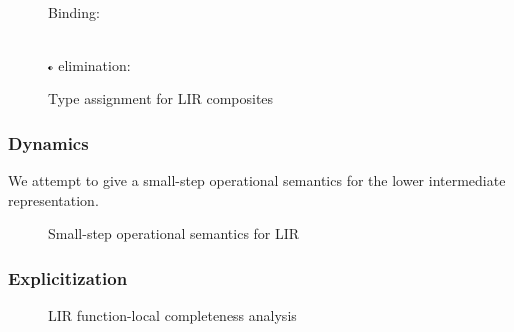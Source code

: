\documentclass[index.tex]{subfiles}
\begin{document}
\begin{figure}
\begin{mathpar}
  \end{mathpar} \\
  Binding:
  \begin{mathpar}
  \end{mathpar} \\
  $\CII$ elimination:
  \begin{mathpar}
  \end{mathpar}
  \caption{Type assignment for LIR composites}
  \label{fig:lir-ta-comp}
\end{figure}

\subsubsection{Dynamics}
\label{sec:lir-dynamics}
We attempt to give a small-step operational semantics for the lower intermediate representation.

\begin{figure}
  \caption{Small-step operational semantics for LIR}
  \label{fig:lir-ssos}
\end{figure}

\subsubsection{Explicitization}
\label{sec:explicitization}

\begin{figure}
  \caption{LIR function-local completeness analysis}
  \label{fig:lir-completeness-analysis-local}
\end{figure}
   
\end{document}
